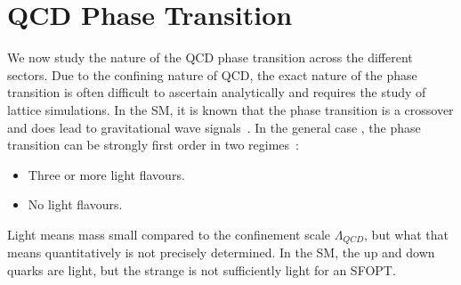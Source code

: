 \documentclass[nofootinbib,twocolumn,preprintnumbers]{revtex4-1}
\begin{document}
\section{QCD Phase Transition}
\label{sec:dQCD}
%

We now study the nature of the QCD phase transition across the different sectors. Due to the confining nature of QCD, the exact nature of the phase transition is often difficult to ascertain analytically and requires the study of lattice simulations. In the SM, it is known that the phase transition is a crossover and does lead to gravitational wave signals~\cite{}. In the general case , the phase transition can be strongly first order in two regimes~\cite{lattice,SVETITSKY1982423,Pisarski:1983ms}:
\begin{itemize}
\item Three or more light flavours.
\item No light flavours. 
\end{itemize}
Light means mass small compared to the confinement scale $\Lambda_{QCD}$, but what that means quantitatively is not precisely determined. In the SM, the up and down quarks are light, but the strange is not sufficiently light for an SFOPT.


%
\end{document}
